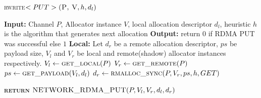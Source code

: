 \documentclass[10pt]{article}
\begin{document}
\begin{algorithm}{}
\footnotesize
\caption{\textsc{rwrite}{$<PUT>\textsc{(P, V}, h, d_l)$}}
\label{alg:rread_PUT} 
\begin{algorithmic}[1]


\STATE \textbf{Input:} Channel $P$, Allocator instance $V$, local allocation descriptor $d_l$,  heuristic $h$ is the algorithm that generates next allocation
\STATE \textbf{Output:} return {$0$} if RDMA PUT was successful else {$1$}
\STATE \textbf{Local:} Let $d_r$ be a remote allocation descriptor,  $ps$ be payload size, $V_l$ and $V_r$ be local and remote(shadow) allocator instances respectively.
\STATE \quad $\textbf{$V_l$} \leftarrow  \textsc{get\_local}(P)$ 
\STATE \quad $\textbf{$V_r$} \leftarrow  \textsc{get\_remote}(P)$ 
\STATE \quad $\textbf{$ps$} \leftarrow  \textsc{get\_payload}(V_l, d_l)$ 
\STATE \quad $\textbf{$d_r$} \leftarrow  \textsc{rmalloc\_sync}(P, V_r, ps, h, GET)$ 

\STATE \textsc{\textbf{return}} {$\textsc{NETWORK\_RDMA\_PUT}(P, V_l, V_r, d_l, d_r)$}
\STATE


\end{algorithmic}
\end{algorithm}




\end{document}
